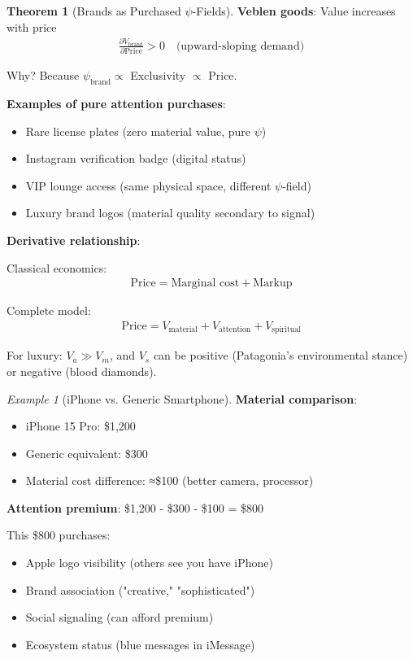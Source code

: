 \documentclass[11pt,a4paper]{article}
\theoremstyle{definition}
\newtheorem{theorem}{Theorem}[section]
\theoremstyle{remark}
\newtheorem{example}{Example}[section]
\begin{document}
\begin{enumerate}
\begin{theorem}[Brands as Purchased \(\psi\)-Fields]
\textbf{Veblen goods}: Value increases with price
\begin{align}
\frac{\partial V_{\text{brand}}}{\partial \text{Price}} > 0 \quad \text{(upward-sloping demand)}
\end{align}

Why? Because \(\psi_{\text{brand}} \propto\) Exclusivity \(\propto\) Price.

\textbf{Examples of pure attention purchases}:
\begin{itemize}
    \item Rare license plates (zero material value, pure \(\psi\))
    \item Instagram verification badge (digital status)
    \item VIP lounge access (same physical space, different \(\psi\)-field)
    \item Luxury brand logos (material quality secondary to signal)
\end{itemize}

\textbf{Derivative relationship}:

Classical economics:
\begin{align}
\text{Price} = \text{Marginal cost} + \text{Markup}
\end{align}

Complete model:
\begin{align}
\text{Price} = V_{\text{material}} + V_{\text{attention}} + V_{\text{spiritual}}
\end{align}

For luxury: \(V_a \gg V_m\), and \(V_s\) can be positive (Patagonia's environmental stance) or negative (blood diamonds).
\end{theorem}

\begin{example}[iPhone vs. Generic Smartphone]
\textbf{Material comparison}:
\begin{itemize}
    \item iPhone 15 Pro: \$1,200
    \item Generic equivalent: \$300
    \item Material cost difference: ≈\$100 (better camera, processor)
\end{itemize}

\textbf{Attention premium}: \$1,200 - \$300 - \$100 = \$800

This \$800 purchases:
\begin{itemize}
    \item Apple logo visibility (others see you have iPhone)
    \item Brand association ("creative," "sophisticated")
    \item Social signaling (can afford premium)
    \item Ecosystem status (blue messages in iMessage)
\end{itemize}


\end{example}
\end{enumerate}
\end{document}
